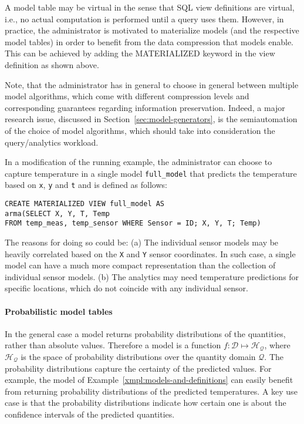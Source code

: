 A model table may be virtual in the sense that SQL view definitions are virtual, i.e., no actual computation is performed until a query uses them. However, in practice, the administrator is motivated to materialize models (and the  respective model tables) in order to benefit from the data compression that models enable. This can be achieved by adding the MATERIALIZED keyword in the view definition as shown above.

Note, that the administrator has in general to choose in general between multiple model algorithms, which come with different compression levels and corresponding guarantees regarding information preservation. Indeed, a major research issue, discussed in Section~\ref{sec:model-generators}, is the semiautomation of the choice of model algorithms, which should take into consideration the query/analytics workload.

\vspace*{0.5cm}
\begin{example}
In a modification of the running example, the administrator can choose to capture temperature in a single model \texttt{full\_model} that predicts the temperature based on \texttt{x}, \texttt{y} and \texttt{t} and is defined as follows:
\begin{verbatim}
CREATE MATERIALIZED VIEW full_model AS 
arma(SELECT X, Y, T, Temp
FROM temp_meas, temp_sensor WHERE Sensor = ID; X, Y, T; Temp)
\end{verbatim}

The reasons for doing so could be: (a) The individual sensor models may be heavily correlated based on the \texttt{X} and \texttt{Y} sensor coordinates. In such case, a single model can have a much more compact representation than the collection of individual sensor models.
(b) The analytics may need temperature predictions for specific locations, which do not coincide with any individual sensor.
\end{example}
\vspace*{0.5cm}


\paragraph{Probabilistic model tables} In the general case a model returns probability distributions of the quantities, rather than absolute values. Therefore a model is a function $f:\mathcal{D}\mapsto \mathcal{H_{Q}}$, where $\mathcal{H_{Q}}$ is the space of probability distributions over the quantity domain $\mathcal{Q}$. The probability distributions capture the certainty of the predicted values.  For example, the model of Example~\ref{xmpl:models-and-definitions} can easily benefit from returning probability distributions of the predicted temperatures. A key use case is that the probability distributions indicate how certain one is about the confidence intervals of the predicted quantities.

